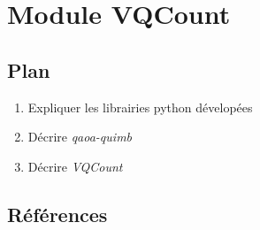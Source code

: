 
\section{Module VQCount}

\subsection*{Plan}

\begin{enumerate}
    \item Expliquer les librairies python dévelopées
    \item Décrire \textit{qaoa-quimb}
    \item Décrire \textit{VQCount}
\end{enumerate}

\subsection*{Références}